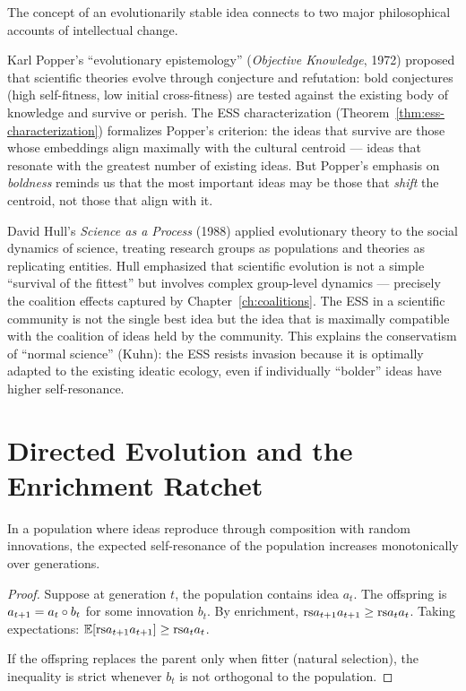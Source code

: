 \begin{interpretation}
\label{interp:ch17:popper_hull}
The concept of an evolutionarily stable idea connects to two major
philosophical accounts of intellectual change.

Karl Popper's ``evolutionary epistemology'' (\textit{Objective Knowledge},
1972) proposed that scientific theories evolve through conjecture and
refutation: bold conjectures (high self-fitness, low initial cross-fitness)
are tested against the existing body of knowledge and survive or perish.
The ESS characterization (Theorem~\ref{thm:ess-characterization}) formalizes
Popper's criterion: the ideas that survive are those whose embeddings align
maximally with the cultural centroid --- ideas that resonate with the greatest
number of existing ideas.  But Popper's emphasis on \emph{boldness} reminds
us that the most important ideas may be those that \emph{shift} the centroid,
not those that align with it.

David Hull's \textit{Science as a Process} (1988) applied evolutionary
theory to the social dynamics of science, treating research groups as
populations and theories as replicating entities.  Hull emphasized that
scientific evolution is not a simple ``survival of the fittest'' but involves
complex group-level dynamics --- precisely the coalition effects captured by
Chapter~\ref{ch:coalitions}.  The ESS in a scientific community is not the
single best idea but the idea that is maximally compatible with the coalition
of ideas held by the community.  This explains the conservatism of
``normal science'' (Kuhn): the ESS resists invasion because it is optimally
adapted to the existing ideatic ecology, even if individually
``bolder'' ideas have higher self-resonance.
\end{interpretation}

\section{Directed Evolution and the Enrichment Ratchet}

\begin{theorem}
\label{thm:enrichment-ratchet}
In a population where ideas reproduce through composition with random
innovations, the expected self-resonance of the population increases
monotonically over generations.
\end{theorem}

\begin{proof}
Suppose at generation $t$, the population contains idea $a_t$.  The offspring
is $a_{t+1} = a_t \circ b_t$ for some innovation $b_t$.  By enrichment,
$\mathrm{rs}{a_{t+1}}{a_{t+1}} \geq \mathrm{rs}{a_t}{a_t}$.  Taking expectations:
$\mathbb{E}[\mathrm{rs}{a_{t+1}}{a_{t+1}}] \geq \mathrm{rs}{a_t}{a_t}$.

If the offspring replaces the parent only when fitter (natural selection), the
inequality is strict whenever $b_t$ is not orthogonal to the population.
\end{proof}

